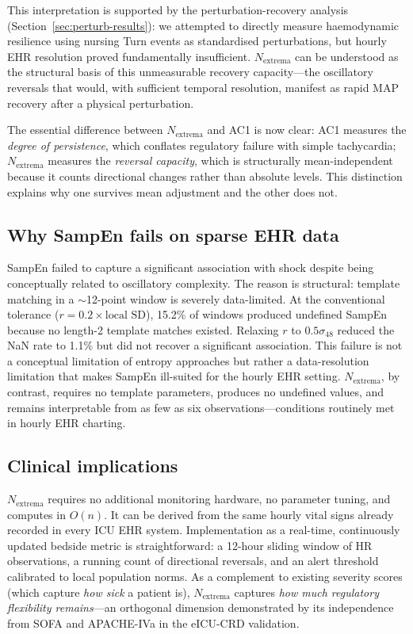 \documentclass[12pt,a4paper]{article}
\begin{document}
This interpretation is supported by the perturbation-recovery analysis
(Section~\ref{sec:perturb-results}): we attempted to directly measure
haemodynamic resilience using nursing Turn events as standardised
perturbations, but hourly EHR resolution proved fundamentally insufficient.
$N_{\text{extrema}}$ can be understood as the structural basis of this
unmeasurable recovery capacity---the oscillatory reversals that would, with
sufficient temporal resolution, manifest as rapid MAP recovery after a
physical perturbation.

The essential difference between $N_{\text{extrema}}$ and AC1 is now clear:
AC1 measures the \emph{degree of persistence}, which conflates regulatory
failure with simple tachycardia;
$N_{\text{extrema}}$ measures the \emph{reversal capacity}, which is
structurally mean-independent because it counts directional changes rather
than absolute levels.
This distinction explains why one survives mean adjustment and the other
does not.

\subsection*{Why SampEn fails on sparse EHR data}

SampEn failed to capture a significant association with shock despite
being conceptually related to oscillatory complexity.
The reason is structural: template matching in a $\sim$12-point window
is severely data-limited.
At the conventional tolerance ($r=0.2 \times \text{local SD}$), 15.2\%
of windows produced undefined SampEn because no length-2 template matches
existed.
Relaxing $r$ to $0.5\sigma_{48}$ reduced the NaN rate to 1.1\% but did
not recover a significant association.
This failure is not a conceptual limitation of entropy approaches but
rather a data-resolution limitation that makes SampEn ill-suited for
the hourly EHR setting.
$N_{\text{extrema}}$, by contrast, requires no template parameters,
produces no undefined values, and remains interpretable from as few as
six observations---conditions routinely met in hourly EHR charting.

\subsection*{Clinical implications}

$N_{\text{extrema}}$ requires no additional monitoring hardware, no
parameter tuning, and computes in $O(n)$.
It can be derived from the same hourly vital signs already recorded in
every ICU EHR system.
Implementation as a real-time, continuously updated bedside metric is
straightforward: a 12-hour sliding window of HR observations, a running
count of directional reversals, and an alert threshold calibrated to
local population norms.
As a complement to existing severity scores (which capture \emph{how sick}
a patient is), $N_{\text{extrema}}$ captures \emph{how much regulatory
flexibility remains}---an orthogonal dimension demonstrated by its
independence from SOFA and APACHE-IVa in the eICU-CRD validation.
\end{document}
